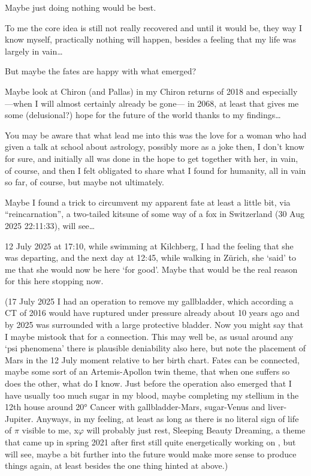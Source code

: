 \begin{itemize}
Maybe just doing nothing would be best.

\newpage

\smaller

To me the core idea is still not really recovered
and until it would be,
they way I know myself,
practically nothing will happen,
besides a feeling that my life was largely in vain…

But maybe the fates are happy with what emerged?

Maybe look at Chiron (and Pallas)
in my Chiron returns of 2018 and especially%
—when I will almost certainly already be gone—%
in 2068,
at least that gives me some (delusional?) hope
for the future of the world
thanks to my findings…

You may be aware
that what lead me into this
was the love for a woman
who had given a talk at school about astrology,
possibly more as a joke then,
I don’t know for sure,
and initially all was done in the hope to get together with her,
in vain, of course,
and then I felt obligated to share what I found for humanity,
all in vain so far, of course,
but maybe not ultimately.

Maybe I found a trick to circumvent my apparent fate at least a little bit, via “reincarnation”,
a two-tailed kitsune of some way of a fox in Switzerland (30 Aug 2025 22:11:33), will see…

12 July 2025 at 17:10,
while swimming at Kilchberg,
I had the feeling that she was departing,
and the next day at 12:45,
while walking in Zürich,
she ‘said’ to me that she would now be here ‘for good’.
%
Maybe that would be the real reason for this here stopping now.

(17 July 2025 I had an operation to remove my gallbladder,
which according a CT of 2016 would have ruptured under pressure already about 10 years ago
and by 2025 was surrounded with a large protective bladder.
%
Now you might say that I maybe mistook that for a connection.
%
This may well be,
as usual around any ‘psi phenomena’ there is plausible deniability also here,
but note the placement of Mars in the 12 July moment relative to her birth chart.
%
Fates can be connected,
maybe some sort of an Artemis-Apollon twin theme,
that when one suffers so does the other,
what do I know.
%
Just before the operation also emerged
that I have usually too much sugar in my blood,
maybe completing my stellium in the 12th house around 20° Cancer
with gallbladder-Mars, sugar-Venus and liver-Jupiter.
%
Anyways,
in my feeling,
at least as long as there is no literal sign of life of $\pi$ visible to me,
x$\varphi$ will probably just rest,
Sleeping Beauty Dreaming,
a theme that came up in spring 2021
after first still quite energetically working on \ELEMENTAL,
but will see,
maybe a bit further into the future would make more sense to produce things again,
at least besides the one thing hinted at above.)


\end{itemize}
